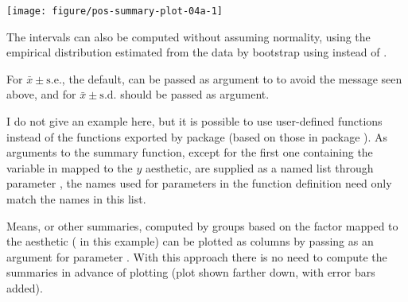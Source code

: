 \documentclass[krantz2]{krantz}\usepackage{knitr}
\begin{document}
\begin{knitrout}\footnotesize
{}\color{fgcolor}\begin{kframe}
\begin{alltt}
 \hlkwb{<-}  \hlopt{+}
  \hlstd{(} \hlstd{=} \hlstd{,}  \hlstd{=} \hlstd{(} \hlstd{=} \hlstd{),}
                \hlstd{=} \hlstd{,}  \hlstd{=} \hlstd{,}  \hlstd{=} \hlstd{,}  \hlstd{=} \hlstd{)}
\end{alltt}
\end{kframe}
\end{knitrout}

\begin{knitrout}\footnotesize
{}\color{fgcolor}\begin{kframe}
\begin{alltt}
 \hlopt{+} 
\end{alltt}
\end{kframe}

{\centering \texttt{[image: figure/pos-summary-plot-04a-1]} 

}


\end{knitrout}

The intervals can also be computed without assuming normality, using the empirical distribution estimated from the data by bootstrap using  instead of .

For $\bar{x} \pm \mathrm{s.e.}$, the default,  can be passed as argument to  to avoid the message seen above, and for $\bar{x} \pm \mathrm{s.d.}$  should be passed as argument.

I do not give an example here, but it is possible to use user-defined functions instead of the functions exported by package \ggplot (based on those in package \Hmisc). As arguments to the summary function, except for the first one containing the variable in  mapped to the $y$ aesthetic, are supplied as a named list through parameter , the names used for parameters in the function definition need only match the names in this list.



Means, or other summaries, computed by groups based on the factor mapped to the  aesthetic ( in this example) can be plotted as columns by passing  as an argument for parameter . With this approach there is no need to compute the summaries in advance of plotting (plot shown farther down, with error bars added).
\end{document}
